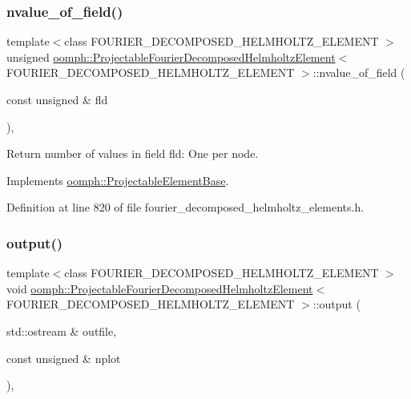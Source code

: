 \subsubsection{\texorpdfstring{nvalue\+\_\+of\+\_\+field()}{nvalue\_of\_field()}}
{\footnotesize\ttfamily template$<$class F\+O\+U\+R\+I\+E\+R\+\_\+\+D\+E\+C\+O\+M\+P\+O\+S\+E\+D\+\_\+\+H\+E\+L\+M\+H\+O\+L\+T\+Z\+\_\+\+E\+L\+E\+M\+E\+NT $>$ \\
unsigned \hyperlink{classoomph_1_1ProjectableFourierDecomposedHelmholtzElement}{oomph\+::\+Projectable\+Fourier\+Decomposed\+Helmholtz\+Element}$<$ F\+O\+U\+R\+I\+E\+R\+\_\+\+D\+E\+C\+O\+M\+P\+O\+S\+E\+D\+\_\+\+H\+E\+L\+M\+H\+O\+L\+T\+Z\+\_\+\+E\+L\+E\+M\+E\+NT $>$\+::nvalue\+\_\+of\+\_\+field (\begin{DoxyParamCaption}\item[{const unsigned \&}]{fld }\end{DoxyParamCaption})\hspace{0.3cm}{\ttfamily [inline]}, {\ttfamily [virtual]}}



Return number of values in field fld\+: One per node. 



Implements \hyperlink{classoomph_1_1ProjectableElementBase_a1a9a6de16f3511bca8e8be770abb9c2e}{oomph\+::\+Projectable\+Element\+Base}.



Definition at line 820 of file fourier\+\_\+decomposed\+\_\+helmholtz\+\_\+elements.\+h.

\mbox{\label{classoomph_1_1ProjectableFourierDecomposedHelmholtzElement_ad174e0b31d3c16cbbbebdfaaee769231}} 
\subsubsection{\texorpdfstring{output()}{output()}}
{\footnotesize\ttfamily template$<$class F\+O\+U\+R\+I\+E\+R\+\_\+\+D\+E\+C\+O\+M\+P\+O\+S\+E\+D\+\_\+\+H\+E\+L\+M\+H\+O\+L\+T\+Z\+\_\+\+E\+L\+E\+M\+E\+NT $>$ \\
void \hyperlink{classoomph_1_1ProjectableFourierDecomposedHelmholtzElement}{oomph\+::\+Projectable\+Fourier\+Decomposed\+Helmholtz\+Element}$<$ F\+O\+U\+R\+I\+E\+R\+\_\+\+D\+E\+C\+O\+M\+P\+O\+S\+E\+D\+\_\+\+H\+E\+L\+M\+H\+O\+L\+T\+Z\+\_\+\+E\+L\+E\+M\+E\+NT $>$\+::output (\begin{DoxyParamCaption}\item[{std\+::ostream \&}]{outfile,  }\item[{const unsigned \&}]{nplot }\end{DoxyParamCaption})\hspace{0.3cm}{\ttfamily [inline]}, {\ttfamily [virtual]}}



